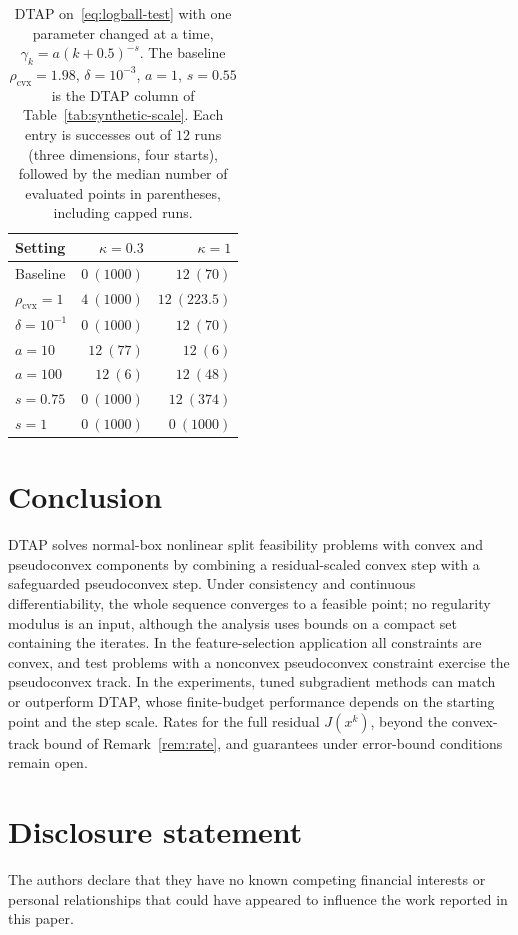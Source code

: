 \documentclass[]{interact}
\theoremstyle{plain}
\theoremstyle{definition}
\theoremstyle{remark}
\newcommand{\cvx}{\mathrm{cvx}}
\begin{document}
\begin{table}[t]
\centering\small
\setlength{\tabcolsep}{5pt}
\caption{DTAP on~\eqref{eq:logball-test} with one parameter changed at a time,
$\gamma_k=a(k+0.5)^{-s}$. The baseline $\rho_{\cvx}=1.98$, $\delta=10^{-3}$, $a=1$,
$s=0.55$ is the DTAP column of Table~\ref{tab:synthetic-scale}. Each entry is
successes out of $12$ runs (three dimensions, four starts), followed by the
median number of evaluated points in parentheses, including capped runs.}
\label{tab:dtap-sweep}
\begin{tabular}{@{}lrr@{}}
\toprule
Setting & $\kappa=0.3$ & $\kappa=1$\\
\midrule
Baseline & $0\ (1000)$ & $12\ (70)$\\
$\rho_{\cvx}=1$ & $4\ (1000)$ & $12\ (223.5)$\\
$\delta=10^{-1}$ & $0\ (1000)$ & $12\ (70)$\\
$a=10$ & $12\ (77)$ & $12\ (6)$\\
$a=100$ & $12\ (6)$ & $12\ (48)$\\
$s=0.75$ & $0\ (1000)$ & $12\ (374)$\\
$s=1$ & $0\ (1000)$ & $0\ (1000)$\\
\bottomrule
\end{tabular}
\end{table}

\section{Conclusion}\label{sec:conclusion}
DTAP solves normal-box nonlinear split feasibility problems with convex and pseudoconvex components by combining a residual-scaled convex step with a safeguarded pseudoconvex step. Under consistency and continuous differentiability, the whole sequence converges to a feasible point; no regularity modulus is an input, although the analysis uses bounds on a compact set containing the iterates. In the feature-selection application all constraints are convex, and test problems with a nonconvex pseudoconvex constraint exercise the pseudoconvex track. In the experiments, tuned subgradient methods can match or outperform DTAP, whose finite-budget performance depends on the starting point and the step scale. Rates for the full residual $J(x^k)$, beyond the convex-track bound of Remark~\ref{rem:rate}, and guarantees under error-bound conditions remain open.

\section*{Disclosure statement}
The authors declare that they have no known competing financial interests or personal relationships that could have appeared to influence the work reported in this paper.
\end{document}
